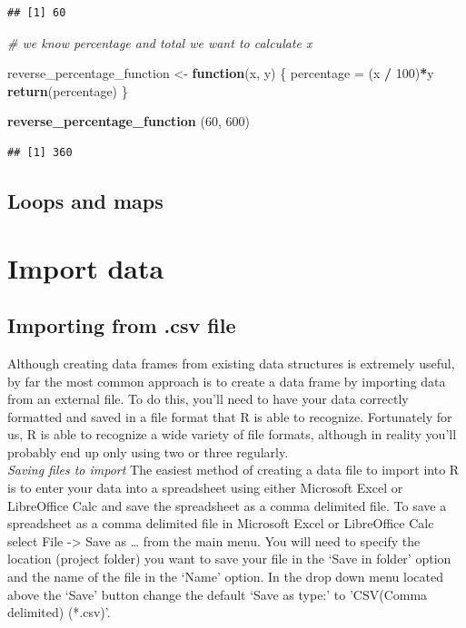 \documentclass[
]{book}
\newenvironment{Shaded}{\begin{snugshade}}{\end{snugshade}}
\newcommand{\CommentTok}[1]{\textcolor[rgb]{0.56,0.35,0.01}{\textit{#1}}}
\newcommand{\ControlFlowTok}[1]{\textcolor[rgb]{0.13,0.29,0.53}{\textbf{#1}}}
\newcommand{\DecValTok}[1]{\textcolor[rgb]{0.00,0.00,0.81}{#1}}
\newcommand{\FunctionTok}[1]{\textcolor[rgb]{0.13,0.29,0.53}{\textbf{#1}}}
\newcommand{\NormalTok}[1]{#1}
\newcommand{\OtherTok}[1]{\textcolor[rgb]{0.56,0.35,0.01}{#1}}
\newcommand{\SpecialCharTok}[1]{\textcolor[rgb]{0.81,0.36,0.00}{\textbf{#1}}}
\begin{document}
\begin{verbatim}
## [1] 60
\end{verbatim}

\begin{Shaded}
\begin{Highlighting}[]
\CommentTok{\# we know percentage and total we want to calculate x}

\NormalTok{reverse\_percentage\_function }\OtherTok{\textless{}{-}} \ControlFlowTok{function}\NormalTok{(x, y) \{}
\NormalTok{  percentage }\OtherTok{=}\NormalTok{ (x }\SpecialCharTok{/} \DecValTok{100}\NormalTok{)}\SpecialCharTok{*}\NormalTok{y}
  \FunctionTok{return}\NormalTok{(percentage)}
\NormalTok{\}}

\FunctionTok{reverse\_percentage\_function}\NormalTok{ (}\DecValTok{60}\NormalTok{, }\DecValTok{600}\NormalTok{)}
\end{Highlighting}
\end{Shaded}

\begin{verbatim}
## [1] 360
\end{verbatim}

\hypertarget{loops-and-maps}{%
\section{Loops and maps}\label{loops-and-maps}}

\hypertarget{import-data}{%
\chapter{Import data}\label{import-data}}

\hypertarget{importing-from-.csv-file}{%
\section{Importing from .csv file}\label{importing-from-.csv-file}}

Although creating data frames from existing data structures is extremely useful, by far the most common approach is to create a data frame by importing data from an external file. To do this, you'll need to have your data correctly formatted and saved in a file format that R is able to recognize. Fortunately for us, R is able to recognize a wide variety of file formats, although in reality you'll probably end up only using two or three regularly.\\
\emph{Saving files to import}
The easiest method of creating a data file to import into R is to enter your data into a spreadsheet using either Microsoft Excel or LibreOffice Calc and save the spreadsheet as a comma delimited file.
To save a spreadsheet as a comma delimited file in Microsoft Excel or LibreOffice Calc select File -\textgreater{} Save as \ldots{} from the main menu. You will need to specify the location (project folder) you want to save your file in the `Save in folder' option and the name of the file in the `Name' option. In the drop down menu located above the `Save' button change the default `Save as type:' to 'CSV(Comma delimited) (*.csv)'.
\end{document}
